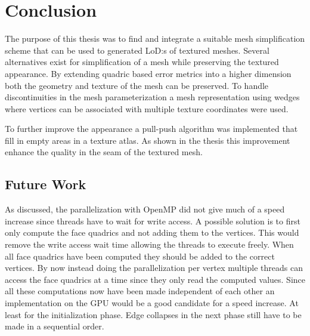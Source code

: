 
\chapter{Conclusion} \label{cha:conclusion}

The purpose of this thesis was to find and integrate a suitable mesh simplification scheme that can be used to generated LoD:s of textured meshes. Several alternatives exist for simplification of a mesh while preserving the textured appearance. By extending quadric based error metrics into a higher dimension both the geometry and texture of the mesh can be preserved. To handle discontinuities in the mesh parameterization a mesh representation using wedges where vertices can be associated with multiple texture coordinates were used.

To further improve the appearance a pull-push algorithm was implemented that fill in empty areas in a texture atlas. As shown in the thesis this improvement enhance the quality in the seam of the textured mesh.

\section{Future Work}
As discussed, the parallelization with OpenMP did not give much of a speed increase since threads have to wait for write access. A possible solution is to first only compute the face quadrics and not adding them to the vertices. This would remove the write access wait time allowing the threads to execute freely. When all face quadrics have been computed they should be added to the correct vertices. By now instead doing the parallelization per vertex multiple threads can access the face quadrics at a time since they only read the computed values. Since all these computations now have been made independent of each other an implementation on the GPU would be a good candidate for a speed increase. At least for the initialization phase. Edge collapses in the next phase still have to be made in a sequential order.  

